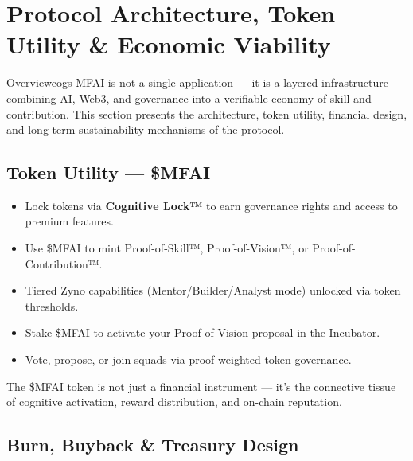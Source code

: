 \section{Protocol Architecture, Token Utility \& Economic Viability}

\begin{mfai-box}{Overview}{cogs}
MFAI is not a single application — it is a layered infrastructure combining AI, Web3, and governance into a verifiable economy of skill and contribution. This section presents the architecture, token utility, financial design, and long-term sustainability mechanisms of the protocol.
\end{mfai-box}

\vspace{1.5em}

\subsection*{Token Utility — \$MFAI}

\begin{itemize}
  \item {} Lock tokens via \textbf{Cognitive Lock™} to earn governance rights and access to premium features.
  \item {} Use \$MFAI to mint Proof-of-Skill™, Proof-of-Vision™, or Proof-of-Contribution™.
  \item {} Tiered Zyno capabilities (Mentor/Builder/Analyst mode) unlocked via token thresholds.
  \item {} Stake \$MFAI to activate your Proof-of-Vision proposal in the Incubator.
  \item {} Vote, propose, or join squads via proof-weighted token governance.
\end{itemize}

\vspace{1.5em}

\begin{mfai-note}
The \$MFAI token is not just a financial instrument — it’s the connective tissue of cognitive activation, reward distribution, and on-chain reputation.
\end{mfai-note}

\vspace{2em}

\subsection*{Burn, Buyback \& Treasury Design}

